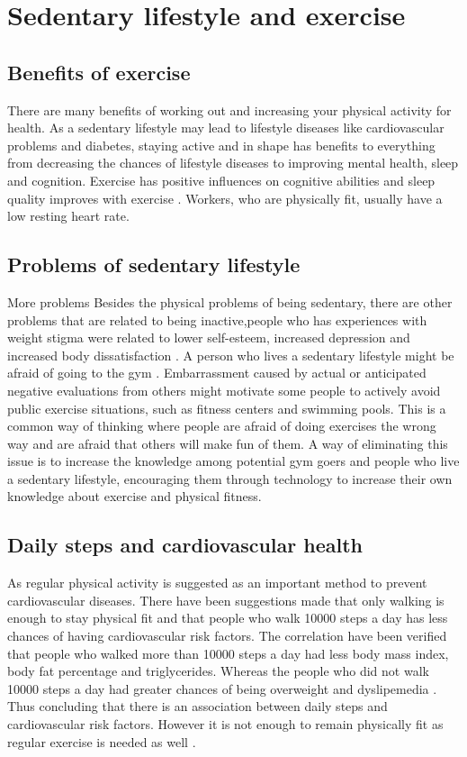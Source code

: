 \chapter{Sedentary lifestyle and exercise}

\section{Benefits of exercise}
There are many benefits of working out and increasing your physical activity for health. As a sedentary lifestyle may lead to lifestyle diseases like cardiovascular problems and diabetes, staying active and in shape has benefits to everything from decreasing the chances of lifestyle diseases to improving mental health, sleep and cognition. Exercise has positive influences on cognitive abilities and sleep quality improves with exercise \cite{Lurati}. Workers, who are physically fit, usually have a low resting heart rate.

\section{Problems of sedentary lifestyle}
More problems
Besides the physical problems of being sedentary, there are other problems that are related to being inactive,people who has experiences with weight stigma were related to lower self-esteem, increased depression and increased body dissatisfaction \cite{Friedman}.
A person who lives a sedentary lifestyle might be afraid of going to the gym \cite{Vartanian2008}. Embarrassment caused by actual or anticipated negative evaluations from others might motivate some people to actively avoid public exercise situations, such as fitness centers and swimming pools. This is a common way of thinking where people are afraid of doing exercises the wrong way and are afraid that others will make fun of them. A way of eliminating this issue is to increase the knowledge among potential gym goers and people who live a sedentary lifestyle, encouraging them through technology to increase their own knowledge about exercise and physical fitness.

\section{Daily steps and cardiovascular health}
As regular physical activity is suggested as an important method to prevent cardiovascular diseases. There have been suggestions made that only walking is enough to stay physical fit and that people who walk 10000 steps a day has less chances of having cardiovascular risk factors. The correlation have been verified that people who walked more than 10000 steps a day had less body mass index, body fat percentage and triglycerides. Whereas the people who did not walk 10000 steps a day had greater chances of being overweight and dyslipemedia \cite{Rodrigues}. Thus concluding that there is an association between daily steps and cardiovascular risk factors. However it is not enough to remain physically fit as regular exercise is needed as well \cite{WHO}.

